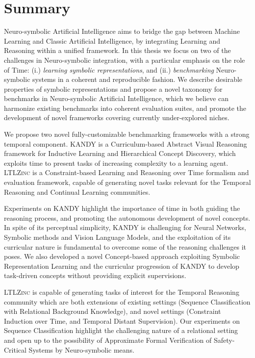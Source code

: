 \documentclass[a4paper,twoside,openright]{book}
\theoremstyle{plain}
\theoremstyle{definition}
\begin{document}
\chapter{Summary}
Neuro-symbolic Artificial Intelligence aims to bridge the gap between Machine Learning and Classic Artificial Intelligence, by integrating Learning and Reasoning within a unified framework. In this thesis we focus on two of the challenges in Neuro-symbolic integration, with a particular emphasis on the role of Time: (i.) \textit{learning symbolic representations}, and (ii.) \textit{benchmarking} Neuro-symbolic systems in a coherent and reproducible fashion.
We describe desirable properties of symbolic representations and propose a novel taxonomy for benchmarks in Neuro-symbolic Artificial Intelligence, which we believe can harmonize existing benchmarks into coherent evaluation suites, and promote the development of novel frameworks covering currently under-explored niches.

We propose two novel fully-customizable benchmarking frameworks with a strong temporal component. \textsc{KANDY} is a Curriculum-based Abstract Visual Reasoning framework for Inductive Learning and Hierarchical Concept Discovery, which exploits time to present tasks of increasing complexity to a learning agent.
\textsc{LTLZinc} is a Constraint-based Learning and Reasoning over Time formalism and evaluation framework, capable of generating novel tasks relevant for the Temporal Reasoning and Continual Learning communities.

Experiments on \textsc{KANDY} highlight the importance of time in both guiding the reasoning process, and promoting the autonomous development of novel concepts. In spite of its perceptual simplicity, \textsc{KANDY} is challenging for Neural Networks, Symbolic methods and Vision Language Models, and the exploitation of its curricular nature is fundamental to overcome some of the reasoning challenges it poses. We also developed a novel Concept-based approach exploiting Symbolic Representation Learning and the curricular progression of \textsc{KANDY} to develop task-driven concepts without providing explicit supervisions.

\textsc{LTLZinc} is capable of generating tasks of interest for the Temporal Reasoning community which are both extensions of existing settings (Sequence Classification with Relational Background Knowledge), and novel settings (Constraint Induction over Time, and Temporal Distant Supervision). Our experiments on Sequence Classification highlight the challenging nature of a relational setting and open up to the possibility of Approximate Formal Verification of Safety-Critical Systems by Neuro-symbolic means.
\end{document}
